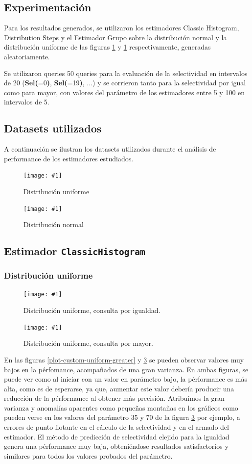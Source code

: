 \documentclass[a4paper, 10pt, twoside]{article}
\newcommand{\grafico}[3]{
  \begin{figure}[H]
    \texttt{[image: \#1]}
    \caption{#2}
    \label{#3}
  \end{figure}
}
\begin{document}
\subsection{Experimentación}
Para los resultados generados, se utilizaron los estimadores Classic Histogram, Distribution Steps y el Estimador Grupo 
sobre la distribución normal y la distribución uniforme de las figuras \ref{custom-dataset-uniform} y 
\ref{custom-dataset-uniform} respectivamente, generadas aleatoriamente. 

Se utilizaron queries 50 queries para la evaluación de la selectividad en intervalos de 20 (\textbf{Sel(}=0\textbf{)}, \textbf{Sel(}=19\textbf{)}, ...) y se corrieron tanto para la selectividad por igual como para mayor, con valores del 
parámetro de los estimadores entre 5 y 100 en intervalos de 5.



\subsection{Datasets utilizados}

A continuación se ilustran los datasets utilizados durante el análisis de performance de los estimadores estudiados.

\grafico{custom-dataset-uniform}
        {Distribución uniforme}
        {custom-dataset-uniform}

\grafico{custom-dataset-normal}
        {Distribución normal}
        {custom-dataset-normal}


\subsection{Estimador \texttt{ClassicHistogram}}

\subsubsection{Distribución uniforme}

\grafico{plot-hist-uniform-equal}
        {Distribución uniforme, consulta por igualdad.}
        {plot-hist-uniform-equal}
\grafico{plot-hist-uniform-greater}
        {Distribución uniforme, consulta por mayor.}
        {plot-hist-uniform-greater}

En las figuras \ref{plot-custom-uniform-greater} y \ref{plot-hist-uniform-equal} se pueden observar valores muy bajos
en la pérfomance, acompañados de una gran varianza. En ambas figuras, se puede ver como al iniciar con un valor en parámetro bajo,
la pérformance es más alta, como es de esperarse, ya que, aumentar este valor debería producir una reducción de la pérformance al obtener más precisión.
Atribuímos la gran varianza y anomalías aparentes como pequeñas montañas en los gráficos como pueden verse en los
valores del parámetro 35 y 70 de la figura \ref{plot-hist-uniform-equal} por ejemplo, a errores de punto flotante en el cálculo de la selectividad 
y en el armado del estimador.
El método de predicción de selectividad elejido para la igualdad genera una pérformance muy baja, obteniéndose resultados satisfactorios y similares para
todos los valores probados del parámetro.
\end{document}
